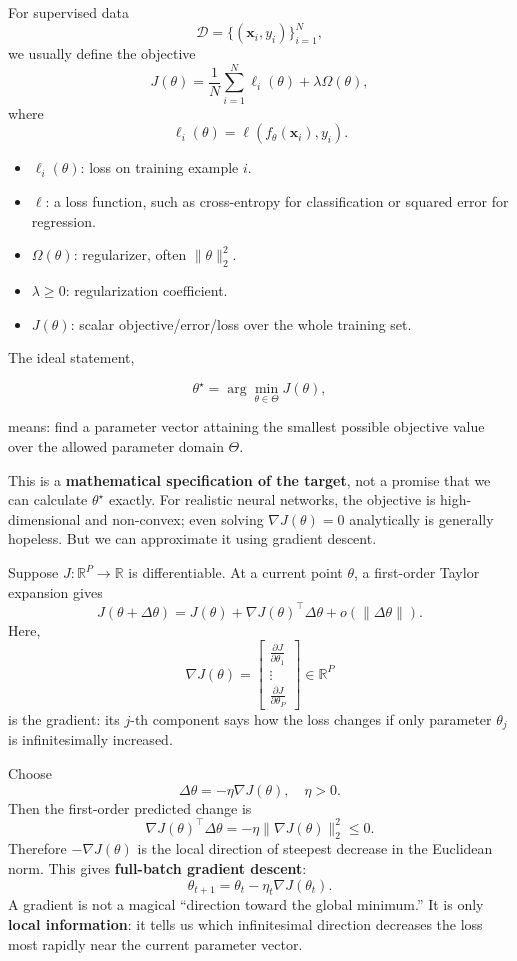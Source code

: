 \documentclass[11pt,a4paper]{article}
\theoremstyle{definition}
\begin{document}
For supervised data
\[
\mathcal{D} = \{(\boldsymbol{x}_i, y_i)\}_{i=1}^N,
\]
we usually define the objective
\[
J(\theta) = \frac{1}{N} \sum_{i=1}^N \ell_i(\theta) + \lambda \Omega(\theta),
\]
where
\[
\ell_i(\theta) = \ell(f_{\theta}(\boldsymbol{x}_i), y_i).
\]
\begin{itemize}
    \item $\ell_i(\theta)$: loss on training example $i$.
    \item $\ell$: a loss function, such as cross-entropy for classification or squared error for regression.
    \item $\Omega(\theta)$: regularizer, often $\|\theta\|_2^2$.
    \item $\lambda \geq 0$: regularization coefficient.
    \item $J(\theta)$: scalar objective/error/loss over the whole training set.
\end{itemize}
The ideal statement, 


$$\theta^\star = \arg \min_{\theta \in \Theta} J(\theta),$$

means: find a parameter vector attaining the smallest possible objective value over the allowed parameter domain $\Theta$.

This is a \textbf{mathematical specification of the target}, not a promise that we can calculate $\theta^\star$ exactly. For realistic neural networks, the objective is high-dimensional and non-convex; even solving $\nabla J(\theta) = 0$ analytically is generally hopeless. But we can approximate it using gradient descent.

Suppose $J : \mathbb{R}^P \to \mathbb{R}$ is differentiable. At a current point $\theta$, a first-order Taylor expansion gives
\[
J(\theta + \Delta\theta) = J(\theta) + \nabla J(\theta)^\top \Delta\theta + o(\|\Delta\theta\|).
\]
Here,
\[
\nabla J(\theta) = \begin{bmatrix} \frac{\partial J}{\partial \theta_1} \\ \vdots \\ \frac{\partial J}{\partial \theta_P} \end{bmatrix} \in \mathbb{R}^P
\]
is the gradient: its $j$-th component says how the loss changes if only parameter $\theta_j$ is infinitesimally increased.

Choose
\[
\Delta\theta = -\eta \nabla J(\theta), \quad \eta > 0.
\]
Then the first-order predicted change is
\[
\nabla J(\theta)^\top \Delta\theta = -\eta \|\nabla J(\theta)\|_2^2 \leq 0.
\]
Therefore $-\nabla J(\theta)$ is the local direction of steepest decrease in the Euclidean norm. This gives \textbf{full-batch gradient descent}:
\[
\theta_{t+1} = \theta_t - \eta_t \nabla J(\theta_t).
\]
A gradient is not a magical ``direction toward the global minimum.'' It is only \textbf{local information}: it tells us which infinitesimal direction decreases the loss most rapidly near the current parameter vector.
\end{document}
